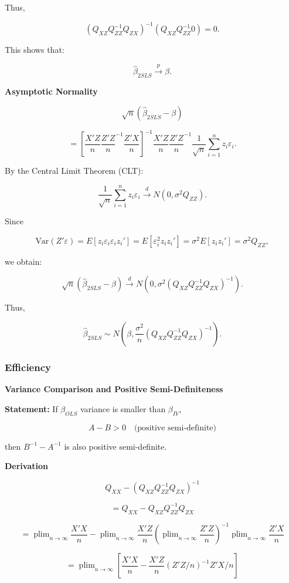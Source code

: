 \documentclass[12pt, oneside]{article}
\DeclareMathOperator*{\plim}{plim}
\begin{document}
Thus,

\[
(Q_{XZ} Q_{ZZ}^{-1} Q_{ZX})^{-1} (Q_{XZ} Q_{ZZ}^{-1} 0) = 0.
\]

This shows that:

\[
\hat{\beta}_{2SLS} \xrightarrow{p} \beta.
\]

\textbf*{Asymptotic Normality}

\[
\sqrt{n} (\hat{\beta}_{2SLS} - \beta)
\]

\[
= \left[ \frac{X'Z}{n} \frac{Z'Z}{n}^{-1} \frac{Z'X}{n} \right]^{-1} \frac{X'Z}{n} \frac{Z'Z}{n}^{-1} \frac{1}{\sqrt{n}} \sum_{i=1}^{n} z_i \varepsilon_i.
\]

By the Central Limit Theorem (CLT):

\[
\frac{1}{\sqrt{n}} \sum_{i=1}^{n} z_i \varepsilon_i \xrightarrow{d} N(0, \sigma^2 Q_{ZZ}).
\]

Since

\[
\text{Var}(Z'\varepsilon) = E[z_i \varepsilon_i \varepsilon_i z_i'] = E[\varepsilon_i^2 z_i z_i'] = \sigma^2 E[z_i z_i'] = \sigma^2 Q_{ZZ},
\]

we obtain:

\[
\sqrt{n} (\hat{\beta}_{2SLS} - \beta) \xrightarrow{d} N(0, \sigma^2 (Q_{XZ} Q_{ZZ}^{-1} Q_{ZX})^{-1}).
\]

Thus,

\[
\hat{\beta}_{2SLS} \sim N(\beta, \frac{\sigma^2}{n} (Q_{XZ} Q_{ZZ}^{-1} Q_{ZX})^{-1}).
\]

\subsubsection{Efficiency}
\textbf*{Variance Comparison and Positive Semi-Definiteness}

\textbf{Statement:} If \( \beta_{OLS} \) variance is smaller than \( \beta_{IV} \),

\[
A - B > 0 \quad \text{(positive semi-definite)}
\]

then \( B^{-1} - A^{-1} \) is also positive semi-definite.

\textbf*{Derivation}

\[
Q_{XX} - (Q_{XZ} Q_{ZZ}^{-1} Q_{ZX})^{-1}
\]

\[
= Q_{XX} - Q_{XZ} Q_{ZZ}^{-1} Q_{ZX}
\]

\[
= \plim_{n \to \infty} \frac{X'X}{n} - \plim_{n \to \infty} \frac{X'Z}{n} \left( \plim_{n \to \infty} \frac{Z'Z}{n} \right)^{-1} \plim_{n \to \infty} \frac{Z'X}{n}
\]

\[
= \plim_{n \to \infty} \left[ \frac{X'X}{n} - \frac{X'Z}{n} (Z'Z/n)^{-1} Z'X/n \right]
\]
\end{document}
